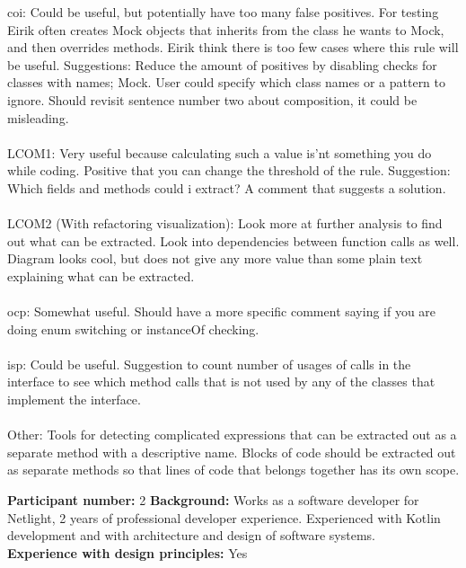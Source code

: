 \noindent \gls{coi}: Could be useful, but potentially have too many false positives. For testing Eirik often creates Mock objects that inherits from the class he wants to Mock, and then overrides methods. Eirik think there is too few cases where this rule will be useful. Suggestions: Reduce the amount of positives by disabling checks for classes with names; Mock. User could specify which class names or a pattern to ignore. Should revisit sentence number two about composition, it could be misleading.\\\\

\noindent LCOM1: Very useful because calculating such a value is'nt something you do while coding. Positive that you can change the threshold of the rule. Suggestion: Which fields and methods could i extract? A comment that suggests a solution. \\\\

\noindent LCOM2 (With refactoring visualization): Look more at further analysis to find out what can be extracted. Look into dependencies between function calls as well. Diagram looks cool, but does not give any more value than some plain text explaining what can be extracted. \\\\

\noindent \gls{ocp}: Somewhat useful. Should have a more specific comment saying if you are doing enum switching or instanceOf checking. \\\\

\noindent \gls{isp}: Could be useful. Suggestion to count number of usages of calls in the interface to see which method calls that is not used by any of the classes that implement the interface. \\\\

\noindent Other: Tools for detecting complicated expressions that can be extracted out as a separate method with a descriptive name. Blocks of code should be extracted out as separate methods so that lines of code that belongs together has its own scope. 
\clearpage


\noindent\textbf{Participant number:} 2 \newline
\textbf{Background:} Works as a software developer for Netlight, 2 years of professional developer experience. Experienced with Kotlin development and with architecture and design of software systems.\\
\textbf{Experience with design principles:} Yes \\\\

